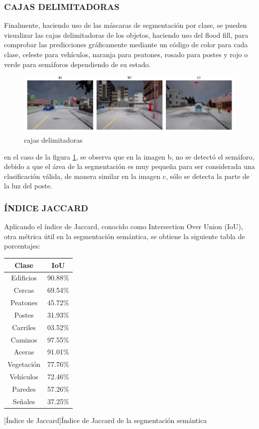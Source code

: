 	\subsubsection{CAJAS DELIMITADORAS}
	Finalmente, haciendo uso de las máscaras de segmentación por clase, se pueden visualizar las cajas delimitadoras de los objetos, haciendo uso del flood fill, para comprobar las predicciones gráficamente mediante un código de color para cada clase, celeste para vehículos, naranja para peatones, rosado para postes y rojo o verde para semáforos dependiendo de su estado.
	
	\begin{figure}[H]
		\centering
		\includegraphics[scale=0.64]{imagenes/preds/boxes}
		\caption[Cajas delimitadoras]{cajas delimitadoras}
		\label{boxes}
	\end{figure}

	en el caso de la figura \ref{boxes}, se observa que en la imagen b, no se detectó el semáforo, debido a que el área de la segmentación es muy pequeña para ser considerada una clasificación válida, de manera similar en la imagen c, sólo se detecta la parte de la luz del poste.
	
	\subsubsection{ÍNDICE JACCARD}
	Aplicando el índice de Jaccard, conocido como Intersection Over Union (IoU), otra métrica útil en la segmentación semántica, se obtiene la siguiente tabla de porcentajes:
	
	\begin{center}
		\footnotesize
		\begin{tabular}{|c|c|}
			\hline
			\textbf{Clase} & \textbf{IoU}\\
			\hline
			Edificios & 90.88\%\\
			\hline
			Cercas &  69.54\%\\
			\hline
			Peatones & 45.72\%\\
			\hline
			Postes & 31.93\%\\
			\hline
			Carriles & 03.52\%\\
			\hline
			Caminos & 97.55\%\\
			\hline
			Aceras & 91.01\%\\
			\hline
			Vegetación & 77.76\%\\
			\hline
			Vehículos & 72.46\%\\
			\hline
			Paredes & 57.26\%\\
			\hline
			Señales & 37.25\%\\
			\hline
		\end{tabular}
		[Índice de Jaccard]{Índice de Jaccard de la segmentación semántica}\label{iou}
	\end{center}

